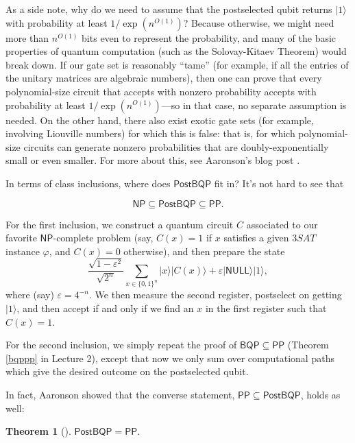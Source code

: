 \documentclass[12pt]{report}
\theoremstyle{plain}
\newtheorem{theorem}{Theorem}[section]
\theoremstyle{definition}
\renewcommand{\ket}[1]{|#1\rangle}
\begin{document}
As a side note, why do we need to assume that the postselected qubit returns
  $\ket{1}$ with probability at least $1/\exp(n^{O(1)})$?  Because otherwise, we might need more than $n^{O(1)}$ bits even to represent
  the probability, and many of the basic properties of quantum computation (such as the Solovay-Kitaev Theorem) would break down.
  If our gate set is reasonably ``tame'' (for example, if all the entries of the unitary matrices are algebraic numbers), then one can prove
  that every polynomial-size circuit that accepts with nonzero probability accepts with probability at least $1/\exp(n^{O(1)})$---so in that
  case, no separate assumption is needed.  On the other hand, there also exist exotic gate sets (for example, involving Liouville numbers) for which this is false: that is, for which polynomial-size circuits can generate nonzero probabilities that are doubly-exponentially small or even smaller. For more about this, see Aaronson's blog post \cite{Aar14}.

In terms of class inclusions, where does $\mathsf{PostBQP}$ fit in?  It's not hard to see that

$$ \mathsf{NP} \subseteq \mathsf{PostBQP} \subseteq \mathsf{PP}. $$

For the first inclusion, we construct a quantum circuit $C$ associated to our favorite $\mathsf{NP}$-complete problem (say, $C(x)=1$ if $x$ satisfies
a given $3SAT$ instance $\varphi$, and $C(x)=0$ otherwise), and then prepare the state
\begin{equation}
   \frac{\sqrt{1-\varepsilon^2}}{\sqrt{2^n}} \sum_{x \in \{0,1\}^n} \ket{x} \ket{ C ( x) } + \varepsilon
  \ket{ \mathsf{NULL} } \ket{1},
\end{equation}
where (say) $\varepsilon = 4^{-n}$.  We then measure the second register, postselect on getting $\ket{1}$, and then accept if and only if we find an $x$ in the first register such that $C(x)=1$.

For the second inclusion, we simply repeat the proof of $\mathsf{BQP} \subseteq \mathsf{PP}$ (Theorem \ref{bqppp} in Lecture 2), except that now we only sum over computational paths which give the desired outcome on the postselected qubit.

In fact, Aaronson \cite{aar:pp} showed that the converse statement, $\mathsf{PP}\subseteq \mathsf{PostBQP}$, holds as well:
\begin{theorem}[\cite{aar:pp}]
\label{postbqppp}
  $\mathsf{PostBQP}=\mathsf{PP}$.
\end{theorem}
\end{document}

